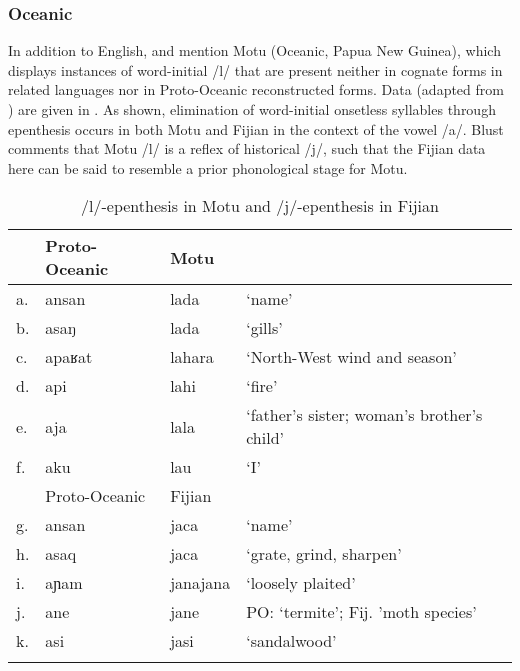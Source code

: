 \documentclass[output=paper,colorlinks,citecolor=brown]{langscibook}
\begin{document}
\subsubsection{Oceanic}
In addition to English, \citet[7]{Vaux2001} and \citet[15]{Morley2015} mention Motu (Oceanic, Papua New Guinea), which displays instances of word-initial /l/ that are present neither in cognate forms in related languages nor in Proto-Oceanic reconstructed forms.  Data (adapted from \citealt{Blust1999}) are given in .  As shown, elimination of word-initial onsetless syllables through epenthesis occurs in both Motu and Fijian in the context of the vowel /a/.  Blust comments that Motu /l/ is a reflex of historical /j/, such that the Fijian data here can be said to resemble a prior phonological stage for Motu.  

\begin{table}
\caption{/l/-epenthesis in Motu and /j/-epenthesis in Fijian}
\label{motu_fij}
\begin{tabularx}{\textwidth}{lllQ}
\lsptoprule
  & {Proto-Oceanic} & {Motu} & \\\midrule
a.& ansan & lada & `name' \\
b.& asaŋ & lada & `gills' \\
c.& apaʁat & lahara & `North-West wind and season' \\
d.& api & lahi & `fire' \\
e.& aja & lala & `father's sister; woman's brother's child' \\
f.& aku & lau & `I' \\\midrule
  & {Proto-Oceanic} & {Fijian} & \\\midrule
g.&  ansan & jaca & `name' \\
h.&  asaq & jaca & `grate, grind, sharpen' \\
i.&  aɲam & janajana & `loosely plaited' \\
j.&  ane & jane & PO: `termite'; Fij. 'moth species' \\
k.&  asi & jasi & `sandalwood' \\
\lspbottomrule
\end{tabularx}
\end{table}
\end{document}
